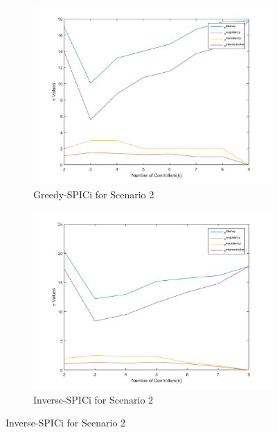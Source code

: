 \documentclass[10pt]{extarticle}
\begin{document}
\begin{figure}
\begin{subfigure}{0.5\linewidth}
			\includegraphics[width=\linewidth]{gspici_2.png}
			\caption{Greedy-SPICi for Scenario 2}
			\label{fig:gspici2}
		\end{subfigure}
		\begin{subfigure}{0.5\linewidth}
			\includegraphics[width=\linewidth]{ispici_2.png}
			\caption{Inverse-SPICi for Scenario 2}
			\label{fig:ispici2}
		\end{subfigure}
	\end{figure}
\end{document}
